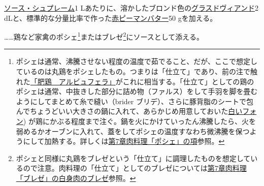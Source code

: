 \begin{recette}
\protect\hyperlink{sauce-supreme}{ソース・シュプレーム}1
Lあたりに、溶かしたブロンド色の\protect\hyperlink{glace-de-viande}{グラスドヴィアンド}2
dLと、標準的な分量比率で作った\protect\hyperlink{beurre-de-pimentos}{赤ピーマンバター}50
gを加える。

\ldots{}\ldots{}鶏など家禽のポシェ\footnote{ポシェは通常、沸騰させない程度の温度で茹でること、だが、ここで想定しているのは丸鶏をポシェしたもの。つまりは「仕立て」であり、前の注で触れた\protect\hyperlink{poularde-albufera}{「肥鶏　アルビュフェラ」}がこれに相当する。「仕立て」としての鶏のポシェは通常、中抜きした部分に詰め物（ファルス）をして手羽を脚を畳むようにしてまとめて糸で縫い（brider
  ブリデ）、さらに豚背脂のシートで包んでちょうどいい大きさの鍋に入れて、あらかじめ用意しておいた\protect\hyperlink{fonds-blanc}{白いフォン})
  が鶏にかぶる程度まで注ぐ。鍋を火にかけていったん沸騰したら、火を弱めるかオーブンに入れて、蓋をしてポシェの温度すなわち微沸騰を保つようにして加熱する。詳しくは\protect\hyperlink{les-poches}{第7章肉料理「ポシェ」の項}参照。}またはブレゼ\footnote{ポシェと同様に丸鶏をブレゼという「仕立て」に調理したものを想定しているので注意。肉料理の「仕立て」としてのブレゼについては\protect\hyperlink{les-braisages-de-viandes-blanches}{第7章肉料理「ブレゼ」の白身肉のブレゼ}参照。}にソースとして添える。

\hypertarget{sauce-americaine}{%
}
\end{recette}
